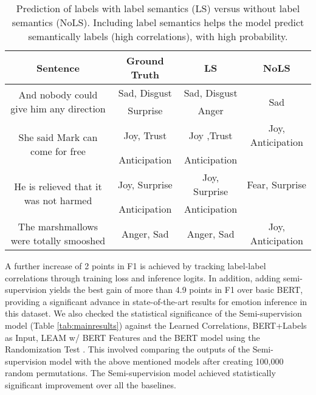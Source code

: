 \documentclass[11pt,a4paper]{article}
\begin{document}
\begin{table*}[ht!]
    
    \begin{tabular}{c|c|c|c}\hline
    \toprule
      \textbf{Sentence} & \textbf{Ground Truth} & \textbf{LS} & \textbf{NoLS} \\
        
      \hline
      \toprule
      \multirow{2}{*}{And nobody could give him any direction} & {Sad, Disgust} & {Sad, Disgust } &  \multirow{2}{*}{Sad} \\
      & {Surprise} & {Anger} & \\ \hline
      \multirow{2}{*}{She said Mark can come for free} & {Joy, Trust} & {Joy ,Trust} & {Joy, Anticipation} \\
      &Anticipation&Anticipation &\\
      \hline
      \midrule
      \multirow{2}{*}{He is relieved that it was not harmed} & {Joy, Surprise } & {Joy, Surprise } & {Fear, Surprise } \\
      &Anticipation&Anticipation&\\\hline
      
      The marshmallows were totally smooshed & {Anger, Sad} & {Anger, Sad} & {Joy, Anticipation} \\

      \hline

      \bottomrule
      
    \end{tabular}

 \caption{Prediction of labels with label semantics (LS) versus without label semantics (NoLS). Including label semantics helps the model predict semantically labels (high correlations), with high probability. }
 \label{tab:model_predict}

\end{table*}
A further increase of 2 points in F1 is achieved by tracking label-label correlations through training loss and inference logits. In addition, adding semi-supervision yields the best gain of more than 4.9 points in F1 over basic BERT, providing a significant advance in state-of-the-art results for emotion inference in this dataset. We also checked the statistical significance of the Semi-supervision model (Table \ref{tab:mainresults}) against the Learned Correlations, BERT+Labels as Input, LEAM w/ BERT Features and the BERT model using the Randomization Test \cite{smucker2007comparison}. This involved comparing the outputs of the Semi-supervision model with the above mentioned models after creating 100,000 random permutations. The Semi-supervision model achieved statistically significant improvement over all the baselines. 
\end{document}
